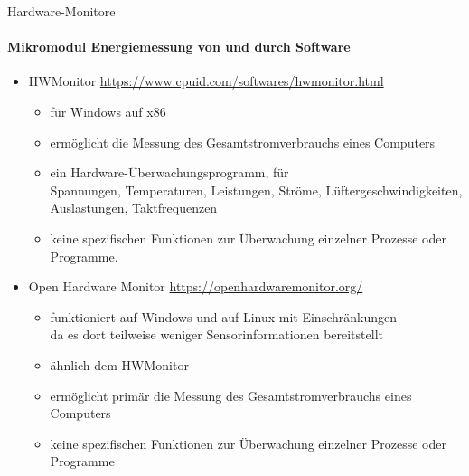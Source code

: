 \begin{frame}{Hardware-Monitore}
\framesubtitle{Mikromodul Energiemessung von und durch Software}
\begin{itemize}
	\item HWMonitor  \href{https://www.cpuid.com/softwares/hwmonitor.html}%
	                      {\tiny https://www.cpuid.com/softwares/hwmonitor.html}
		
		\begin{itemize}
			\item  für Windows auf x86
			\item ermöglicht die Messung des Gesamtstromverbrauchs eines Computers
			\item  ein Hardware-Überwachungsprogramm, für\\
			   Spannungen, Temperaturen, Leistungen, Ströme, Lüftergeschwindigkeiten, Auslastungen, Taktfrequenzen
			\item keine spezifischen Funktionen zur Überwachung einzelner Prozesse oder Programme.
		\end{itemize}
												

\item Open Hardware Monitor  \href{https://openhardwaremonitor.org/}{\tiny https://openhardwaremonitor.org/}
\begin{itemize}
	\item funktioniert auf Windows und auf Linux mit Einschränkungen\\ \hspace*{\fill}
	        da es dort teilweise weniger Sensorinformationen bereitstellt
					
   \item  ähnlich dem HWMonitor
	\item  ermöglicht primär die Messung des Gesamtstromverbrauchs eines Computers
			\item keine spezifischen Funktionen zur Überwachung einzelner Prozesse oder Programme
\end{itemize}
\end{itemize}
\end{frame}


